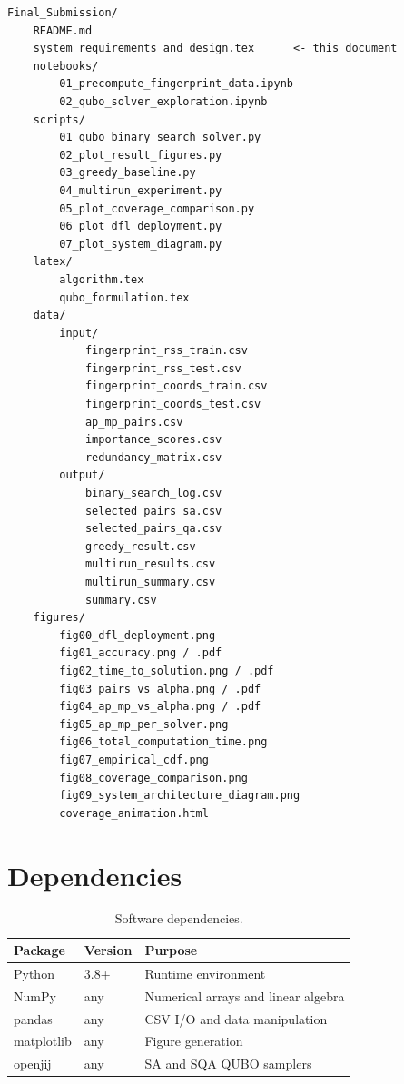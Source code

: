 \documentclass[12pt,a4paper]{article}
\begin{document}
\begin{verbatim}
Final_Submission/
    README.md
    system_requirements_and_design.tex      <- this document
    notebooks/
        01_precompute_fingerprint_data.ipynb
        02_qubo_solver_exploration.ipynb
    scripts/
        01_qubo_binary_search_solver.py
        02_plot_result_figures.py
        03_greedy_baseline.py
        04_multirun_experiment.py
        05_plot_coverage_comparison.py
        06_plot_dfl_deployment.py
        07_plot_system_diagram.py
    latex/
        algorithm.tex
        qubo_formulation.tex
    data/
        input/
            fingerprint_rss_train.csv
            fingerprint_rss_test.csv
            fingerprint_coords_train.csv
            fingerprint_coords_test.csv
            ap_mp_pairs.csv
            importance_scores.csv
            redundancy_matrix.csv
        output/
            binary_search_log.csv
            selected_pairs_sa.csv
            selected_pairs_qa.csv
            greedy_result.csv
            multirun_results.csv
            multirun_summary.csv
            summary.csv
    figures/
        fig00_dfl_deployment.png
        fig01_accuracy.png / .pdf
        fig02_time_to_solution.png / .pdf
        fig03_pairs_vs_alpha.png / .pdf
        fig04_ap_mp_vs_alpha.png / .pdf
        fig05_ap_mp_per_solver.png
        fig06_total_computation_time.png
        fig07_empirical_cdf.png
        fig08_coverage_comparison.png
        fig09_system_architecture_diagram.png
        coverage_animation.html
\end{verbatim}

\section{Dependencies}

\begin{table}[h!]
\centering
\renewcommand{\arraystretch}{1.3}
\begin{tabular}{@{}lll@{}}
\toprule
\textbf{Package} & \textbf{Version} & \textbf{Purpose} \\
\midrule
Python     & 3.8+   & Runtime environment \\
NumPy      & any    & Numerical arrays and linear algebra \\
pandas     & any    & CSV I/O and data manipulation \\
matplotlib & any    & Figure generation \\
openjij    & any    & SA and SQA QUBO samplers \\
\bottomrule
\end{tabular}
\caption{Software dependencies.}
\end{table}
\end{document}
